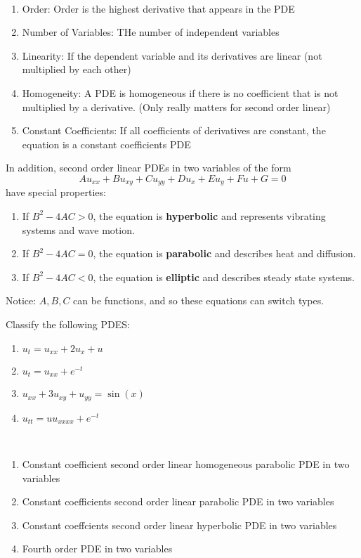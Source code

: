 \documentclass{article}
\begin{document}
\begin{definition}
\ 
\begin{enumerate}
    \item Order: Order is the highest derivative that appears in the PDE
    \item Number of Variables: THe number of independent variables
    \item Linearity: If the dependent variable and its derivatives are linear (not multiplied by each other)
    \item Homogeneity: A PDE is homogeneous if there is no coefficient that is not multiplied by a derivative. (Only really matters for second order linear)
    \item Constant Coefficients: If all coefficients of derivatives are constant, the equation is a constant coefficients PDE
\end{enumerate}

In addition, second order linear PDEs in two variables of the form $$Au_{xx} + Bu_{xy} + Cu_{yy} + Du_x + Eu_y + Fu + G = 0$$have special properties:

\begin{enumerate}
    \item If $B^2 - 4AC > 0$, the equation is \textbf{hyperbolic} and represents vibrating systems and wave motion.
    \item If $B^2 -4AC = 0$, the equation is \textbf{parabolic} and describes heat and diffusion.
    \item If $B^2 - 4AC < 0$, the equation is \textbf{elliptic} and describes steady state systems.
\end{enumerate}
Notice: $A,B,C$ can be functions, and so these equations can switch types.
\end{definition}

\begin{exercise}
Classify the following PDES:
\begin{enumerate}
    \item $u_t = u_{xx} + 2u_x + u$
    \item $u_t = u_{xx} + e^{-t}$
    \item $u_{xx} + 3u_{xy} + u_{yy} = \sin(x)$
    \item $u_{tt} = uu_{xxxx} + e^{-t}$
\end{enumerate}
\end{exercise}

\begin{solution}
\ 
\begin{enumerate}
    \item Constant coefficient second order linear homogeneous parabolic PDE in two variables
    \item Constant coefficients second order linear parabolic PDE in two variables
    \item Constant coeffcients second order linear hyperbolic PDE in two variables
    \item Fourth order PDE in two variables
\end{enumerate}
\end{solution}
\end{document}
